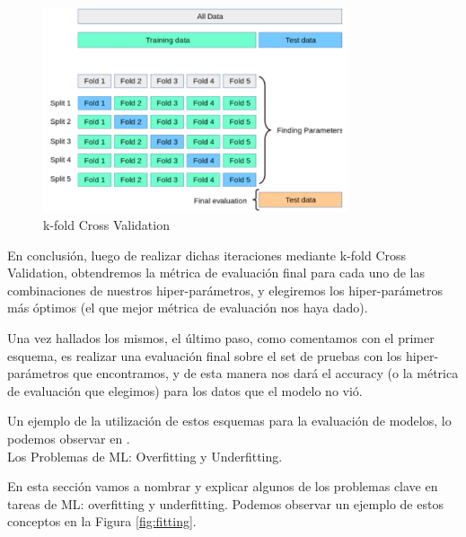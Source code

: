 \documentclass[12pt,a4paper]{article}
\makeatletter
\renewcommand\paragraph{\@startsection{paragraph}{4}{\z@}
            {-2.5ex\@plus -1ex \@minus -.25ex}
            {1.25ex \@plus .25ex}
            {\normalfont\normalsize\bfseries}}
\makeatother
\begin{document}
\begin{sloppypar}
\begin{figure}[H]    %
 \centering
 \includegraphics[width=0.8\textwidth]{images/Cross_Validation.png}
 \caption[k-fold Cross Validation.]{k-fold Cross Validation\protect\footnotemark}
 \label{fig:cross_val}
\end{figure}


En conclusión, luego de realizar dichas iteraciones mediante k-fold Cross Validation, obtendremos la métrica de evaluación final para cada uno de las combinaciones de nuestros hiper-parámetros, y elegiremos los hiper-parámetros más óptimos (el que mejor métrica de evaluación nos haya dado). 

Una vez hallados los mismos, el último paso, como comentamos con el primer esquema, es realizar una evaluación final sobre el set de pruebas con los hiper-parámetros que encontramos, y de esta manera nos dará el accuracy (o la métrica de evaluación que elegimos) para los datos que el modelo no vió.

Un ejemplo de la utilización de estos esquemas para la evaluación de modelos, lo podemos observar en  \textit{}.\\

\paragraph{Los Problemas de ML: Overfitting y Underfitting.}\label{Over_y_under}

En esta sección vamos a nombrar y explicar algunos de los problemas clave en tareas de ML: overfitting y underfitting. Podemos observar un ejemplo de estos conceptos en la Figura \ref{fig:fitting}.


\end{sloppypar}
\end{document}
